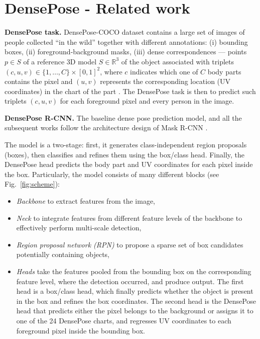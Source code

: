 \section{DensePose - Related work}

\noindent 
\textbf{DensePose task.} DensePose-COCO dataset contains a large set of images of people collected ``in the wild'' together with different annotations: (i) bounding boxes, (ii) foreground-background masks, (iii) dense correspondences --- points $p \in S$ of a reference 3D model $S\in\mathbb{R}^3$ of the object associated with triplets $(c, u, v) \in\{1, \ldots, C\} \times[0,1]^{2}$, where $c$ indicates which one of $C$ body parts contains the pixel and $(u,v)$ represents the corresponding location (UV coordinates) in the chart of the part \cite{smpl}.
The DensePose task is then to predict such triplets $(c, u, v)$ for each foreground pixel and every person in the image.
\newline

\noindent \textbf{DensePose R-CNN.} The baseline dense pose prediction model, and all the subsequent works \cite{parsing, uncertainty, monkeys} follow the architecture design of Mask R-CNN \cite{maskrcnn}.

The model is a two-stage: first, it generates class-independent region proposals (boxes), then classifies and refines them using the box/class head. Finally, the DensePose head predicts the body part and UV coordinates for each pixel inside the box. Particularly, the model consists of many different blocks (see Fig.~\ref{fig:scheme}):
\begin{itemize}
    \item \textit{Backbone} to extract features from the image,
    \item \textit{Neck} to integrate features from different feature levels of the backbone to effectively perform multi-scale detection,
    \item \textit{Region proposal network (RPN)} to propose a sparse set of box candidates potentially containing objects,
    \item \textit{Heads} take the features pooled from the bounding box on the corresponding feature level, where the detection occurred, and produce output. The first head is a box/class head, which finally predicts whether the object is present in the box and refines the box coordinates. The second head is the DensePose head that predicts either the pixel belongs to the background or assigns it to one of the 24 DensePose charts, and regresses UV coordinates to each foreground pixel inside the bounding box.
\end{itemize}

